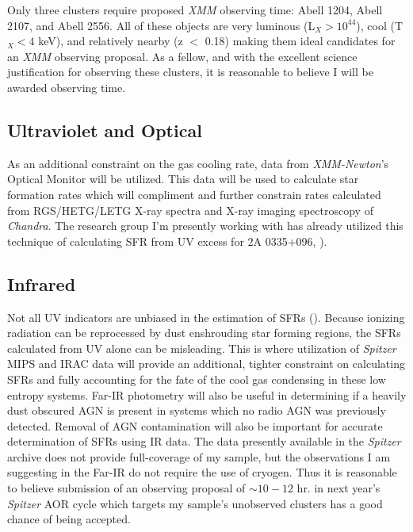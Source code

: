\documentclass[11pt]{article}
\begin{document}
Only three clusters require proposed {\it XMM} observing time: Abell
1204, Abell 2107, and Abell 2556. All of these objects are very
luminous (L$_X > 10^{44}$), cool (T$_X < 4$ keV), and relatively
nearby (z $<$ 0.18) making them ideal candidates for an {\it XMM}
observing proposal. As a fellow, and with the excellent science
justification for observing these clusters, it is reasonable to
believe I will be awarded observing time.

\subsection{Ultraviolet and Optical}
As an additional constraint on the gas cooling rate, data from {\it
XMM-Newton}'s Optical Monitor will be utilized. This data will be used
to calculate star formation rates which will compliment and further
constrain rates calculated from RGS/HETG/LETG X-ray spectra and
X-ray imaging spectroscopy of {\it Chandra}. The research group I'm
presently working with has already utilized this technique of
calculating SFR from UV excess for 2A 0335+096,
\cite{2007AJ....134...14D}).

\subsection{Infrared}
Not all UV indicators are unbiased in the estimation of SFRs
(\cite{2007ApJ...666..870C}). Because ionizing radiation can be
reprocessed by dust enshrouding star forming regions, the SFRs
calculated from UV alone can be misleading. This is where utilization
of {\it Spitzer} MIPS and IRAC data will provide an additional, tighter
constraint on calculating SFRs and fully accounting for the fate of
the cool gas condensing in these low entropy systems. Far-IR
photometry will also be useful in determining if a heavily dust
obscured AGN is present in systems which no radio AGN was previously
detected. Removal of AGN contamination will also be important for
accurate determination of SFRs using IR data. The data presently
available in the {\it Spitzer} archive does not provide full-coverage
of my sample, but the observations I am suggesting in the Far-IR do
not require the use of cryogen. Thus it is reasonable to believe 
submission of an observing proposal of $\sim 10-12$ hr. in next year's
{\it Spitzer} AOR cycle which targets my sample's unobserved clusters
has a good chance of being accepted.
\end{document}
